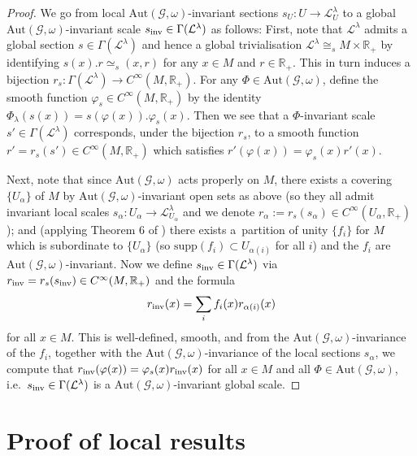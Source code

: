 \documentclass[pdftex]{sigma}
\def\R{\mathbb{R}}
\def\Gbdle{\mathcal{G}}
\def\isom{\cong}
\theoremstyle{plain}
\theoremstyle{definition}
\begin{document}
\begin{proof}
 We go from local $\mathrm{Aut}(\Gbdle,\omega)$-invariant sections $s_U: U \rightarrow \mathcal{L}^{\lambda}_U$ to a global $\mathrm{Aut}(\Gbdle,\omega)$-invariant scale $s_{\rm inv} \in \Gamma(\mathcal{L}^{\lambda})$ as follows: First, note that $\mathcal{L}^{\lambda}$ admits a global section $s \in \Gamma(\mathcal{L}^{\lambda})$ and hence a global trivialisation $\mathcal{L}^{\lambda} \isom_s M \times \R_+$ by identifying $s(x).r \simeq_s (x,r)$ for any $x \in M$ and $r \in \R_+$. This in turn induces a bijection $r_s: \Gamma(\mathcal{L}^{\lambda}) \rightarrow C^{\infty}(M,\R_+)$. For any $\Phi \in \mathrm{Aut}(\Gbdle,\omega)$, def\/ine the smooth function $\varphi_s \in C^{\infty}(M,\R_+)$ by the identity $\Phi_{\lambda}(s(x)) = s(\varphi(x)).\varphi_s(x)$. Then we see that a $\Phi$-invariant scale $s' \in \Gamma(\mathcal{L}^{\lambda})$ corresponds, under the bijection $r_s$, to a smooth function $r' = r_s(s') \in C^{\infty}(M,\R_+)$ which satisf\/ies $r'(\varphi(x)) = \varphi_s(x)r'(x)$.

 Next, note that since $\mathrm{Aut}(\Gbdle,\omega)$ acts properly on $M$, there exists a covering $\{U_{\alpha}\}$ of $M$ by $\mathrm{Aut}(\Gbdle,\omega)$-invariant open sets as above (so they all admit invariant local scales $s_{\alpha}:U_{\alpha} \rightarrow \mathcal{L}^{\lambda}_{U_{\alpha}}$ and we denote $r_{\alpha} := r_s(s_{\alpha}) \in C^{\infty}(U_{\alpha},\R_+)$); and (applying Theorem 6 of \cite{Aleks}) there exists a~partition of unity $\{f_i\}$ for $M$ which is subordinate to $\{U_{\alpha}\}$ (so $\mathrm{supp}(f_i) \subset U_{\alpha(i)}$ for all $i$) and the $f_i$ are $\mathrm{Aut}(\Gbdle,\omega)$-invariant. Now we def\/ine $s_{\rm inv} \in \Gamma(\mathcal{L}^{\lambda})$ via $r_{\rm inv} = r_s(s_{\rm inv}) \in C^{\infty}(M,\R_+)$ and the formula
\[
r_{\rm inv}(x) = \sum_{i}f_i(x)r_{\alpha(i)}(x)
\]
for all $x \in M$. This is well-def\/ined, smooth, and from the $\mathrm{Aut}(\Gbdle,\omega)$-invariance of the $f_i$, together with the $\mathrm{Aut}(\Gbdle,\omega)$-invariance of the local sections $s_{\alpha}$, we compute that $r_{\rm inv}(\varphi(x)) = \varphi_s(x)r_{\rm inv}(x)$ for all $x \in M$ and all $\Phi \in \mathrm{Aut}(\Gbdle,\omega)$, i.e.\ $s_{\rm inv} \in \Gamma(\mathcal{L}^{\lambda})$ is a $\mathrm{Aut}(\Gbdle,\omega)$-invariant global scale.
\end{proof}

\section{Proof of local results}\label{section4}
\end{document}
